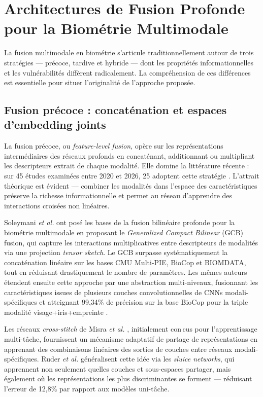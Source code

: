 \documentclass[12pt,a4paper]{report}
\begin{document}
\section{Architectures de Fusion Profonde pour la Biom\'{e}trie Multimodale}
\label{sec:fusion}

La fusion multimodale en biom\'{e}trie s'articule traditionnellement autour de trois strat\'{e}gies --- pr\'{e}coce, tardive et hybride --- dont les propri\'{e}t\'{e}s informationnelles et les vuln\'{e}rabilit\'{e}s diff\`{e}rent radicalement. La compr\'{e}hension de ces diff\'{e}rences est essentielle pour situer l'originalit\'{e} de l'approche propos\'{e}e.

\subsection{Fusion pr\'{e}coce : concat\'{e}nation et espaces d'embedding joints}

La fusion pr\'{e}coce, ou \textit{feature-level fusion}, op\`{e}re sur les repr\'{e}sentations interm\'{e}diaires des r\'{e}seaux profonds en concat\'{e}nant, additionnant ou multipliant les descripteurs extrait de chaque modalit\'{e}. Elle domine la litt\'{e}rature r\'{e}cente : sur 45 \'{e}tudes examin\'{e}es entre 2020 et 2026, 25 adoptent cette strat\'{e}gie \cite{soleymani2021quality}. L'attrait th\'{e}orique est \'{e}vident --- combiner les modalit\'{e}s dans l'espace des caract\'{e}ristiques pr\'{e}serve la richesse informationnelle et permet au r\'{e}seau d'apprendre des interactions crois\'{e}es non lin\'{e}aires.

Soleymani \textit{et al.} \cite{soleymani2018generalized} ont pos\'{e} les bases de la fusion bilin\'{e}aire profonde pour la biom\'{e}trie multimodale en proposant le \textit{Generalized Compact Bilinear} (GCB) fusion, qui capture les interactions multiplicatives entre descripteurs de modalit\'{e}s via une projection \textit{tensor sketch}. Le GCB surpasse syst\'{e}matiquement la concat\'{e}nation lin\'{e}aire sur les bases CMU Multi-PIE, BioCop et BIOMDATA, tout en r\'{e}duisant drastiquement le nombre de param\`{e}tres. Les m\^{e}mes auteurs \'{e}tendent ensuite cette approche par une abstraction multi-niveaux, fusionnant les caract\'{e}ristiques issues de plusieurs couches convolutionnelles de CNNs modali-sp\'{e}cifiques et atteignant 99,34\% de pr\'{e}cision sur la base BioCop pour la triple modalit\'{e} visage+iris+empreinte \cite{soleymani2019multi}.

Les r\'{e}seaux \textit{cross-stitch} de Misra \textit{et al.} \cite{misra2016cross}, initialement con\,{c}us pour l'apprentissage multi-t\^{a}che, fournissent un m\'{e}canisme adaptatif de partage de repr\'{e}sentations en apprenant des combinaisons lin\'{e}aires des sorties de couches entre r\'{e}seaux modali-sp\'{e}cifiques. Ruder \textit{et al.} \cite{ruder2019latent} g\'{e}n\'{e}ralisent cette id\'{e}e via les \textit{sluice networks}, qui apprennent non seulement quelles couches et sous-espaces partager, mais \'{e}galement o\`{u} les repr\'{e}sentations les plus discriminantes se forment --- r\'{e}duisant l'erreur de 12,8\% par rapport aux mod\`{e}les uni-t\^{a}che.
\end{document}
